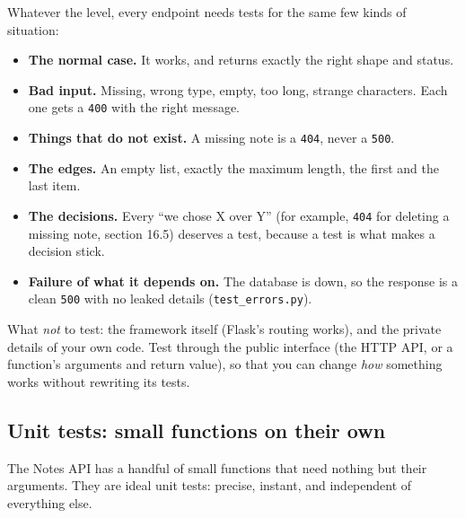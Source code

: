 Whatever the level, every endpoint needs tests for the same few kinds of situation:

\begin{itemize}
\tightlist
\item
  \textbf{The normal case.} It works, and returns exactly the right shape and status.
\item
  \textbf{Bad input.} Missing, wrong type, empty, too long, strange characters. Each one gets a \texttt{400} with the right message.
\item
  \textbf{Things that do not exist.} A missing note is a \texttt{404}, never a \texttt{500}.
\item
  \textbf{The edges.} An empty list, exactly the maximum length, the first and the last item.
\item
  \textbf{The decisions.} Every ``we chose X over Y'' (for example, \texttt{404} for deleting a missing note, section 16.5) deserves a test, because a test is what makes a decision stick.
\item
  \textbf{Failure of what it depends on.} The database is down, so the response is a clean \texttt{500} with no leaked details (\texttt{test\_errors.py}).
\end{itemize}

\noindent{}What \emph{not} to test: the framework itself (Flask's routing works), and the private details of your own code. Test through the public interface (the HTTP API, or a function's arguments and return value), so that you can change \emph{how} something works without rewriting its tests.

\subsection*{Unit tests: small functions on their own}\label{17-build-process:unit-tests-small-functions-on-their-own}

The Notes API has a handful of small functions that need nothing but their arguments. They are ideal unit tests: precise, instant, and independent of everything else.

